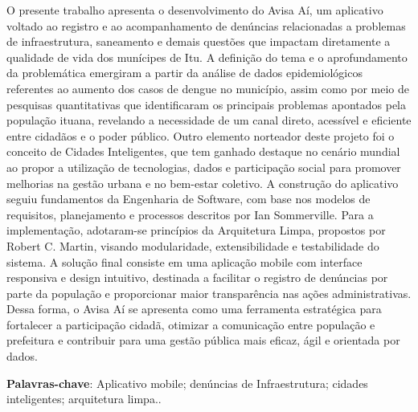 \begin{resumo}
    \SingleSpacing
     O presente trabalho apresenta o desenvolvimento do Avisa Aí, um aplicativo voltado ao registro e ao acompanhamento de denúncias relacionadas a problemas de infraestrutura, saneamento e demais questões que impactam diretamente a qualidade de vida dos munícipes de Itu. A definição do tema e o aprofundamento da problemática emergiram a partir da análise de dados epidemiológicos referentes ao aumento dos casos de dengue no município, assim como por meio de pesquisas quantitativas que identificaram os principais problemas apontados pela população ituana, revelando a necessidade de um canal direto, acessível e eficiente entre cidadãos e o poder público. Outro elemento norteador deste projeto foi o conceito de Cidades Inteligentes, que tem ganhado destaque no cenário mundial ao propor a utilização de tecnologias, dados e participação social para promover melhorias na gestão urbana e no bem-estar coletivo. A construção do aplicativo seguiu fundamentos da Engenharia de Software, com base nos modelos de requisitos, planejamento e processos descritos por Ian Sommerville. Para a implementação, adotaram-se princípios da Arquitetura Limpa, propostos por Robert C. Martin, visando modularidade, extensibilidade e testabilidade do sistema. A solução final consiste em uma aplicação mobile com interface responsiva e design intuitivo, destinada a facilitar o registro de denúncias por parte da população e proporcionar maior transparência nas ações administrativas. Dessa forma, o Avisa Aí se apresenta como uma ferramenta estratégica para fortalecer a participação cidadã, otimizar a comunicação entre população e prefeitura e contribuir para uma gestão pública mais eficaz, ágil e orientada por dados.
    \vspace{\onelineskip}

    \textbf{Palavras-chave}: Aplicativo mobile; denúncias de Infraestrutura; cidades inteligentes; arquitetura limpa..
\end{resumo}

